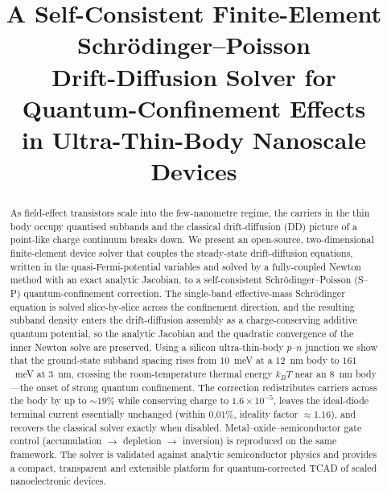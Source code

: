 \documentclass[conference]{IEEEtran}
\begin{document}
\title{A Self-Consistent Finite-Element Schr\"odinger--Poisson\\
Drift-Diffusion Solver for Quantum-Confinement Effects\\
in Ultra-Thin-Body Nanoscale Devices}

\author{%
}

\maketitle

\begin{abstract}
As field-effect transistors scale into the few-nanometre regime, the carriers in
the thin body occupy quantised subbands and the classical drift-diffusion (DD)
picture of a point-like charge continuum breaks down. We present an open-source,
two-dimensional finite-element device solver that couples the steady-state
drift-diffusion equations, written in the quasi-Fermi-potential variables and
solved by a fully-coupled Newton method with an exact analytic Jacobian, to a
self-consistent Schr\"odinger--Poisson (S--P) quantum-confinement correction. The
single-band effective-mass Schr\"odinger equation is solved slice-by-slice across
the confinement direction, and the resulting subband density enters the
drift-diffusion assembly as a charge-conserving additive quantum potential, so
the analytic Jacobian and the quadratic convergence of the inner Newton solve are
preserved. Using a silicon ultra-thin-body $p$--$n$ junction we show that the
ground-state subband spacing rises from $10$~meV at a $12$~nm body to $161$~meV at
$3$~nm, crossing the room-temperature thermal energy $k_BT$ near an
$8$~nm body---the onset of strong quantum confinement. The correction redistributes
carriers across the body by up to $\sim\!19\%$ while conserving charge to
$1.6\times10^{-5}$, leaves the ideal-diode terminal current essentially unchanged
(within $0.01\%$, ideality factor $\approx1.16$), and recovers the classical
solver exactly when disabled. Metal--oxide--semiconductor gate control
(accumulation $\rightarrow$ depletion $\rightarrow$ inversion) is reproduced on
the same framework. The solver is validated against analytic semiconductor
physics and provides a compact, transparent and extensible platform for
quantum-corrected TCAD of scaled nanoelectronic devices.
\end{abstract}
\end{document}

